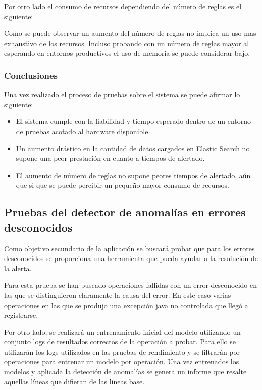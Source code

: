 Por otro lado el consumo de recursos dependiendo del número de reglas es el siguiente:

Como se puede observar un aumento del número de reglas no implica un uso mas exhaustivo de los recursos. Incluso probando con un número de reglas mayor al esperando en entornos productivos el uso de memoria se puede considerar bajo.


\subsubsection{Conclusiones}

Una vez realizado el proceso de pruebas sobre el sistema se puede afirmar lo siguiente:

\begin{itemize}

\item El sistema cumple con la fiabilidad y tiempo esperado dentro de un entorno de pruebas acotado al hardware disponible.

\item Un aumento drástico en la cantidad de datos cargados en Elastic Search no supone una peor prestación en cuanto a tiempos de alertado.

\item El aumento de número de reglas no supone peores tiempos de alertado, aún que si que se puede percibir un pequeño mayor consumo de recursos. 

\end{itemize}


\subsection{Pruebas del detector de anomalías en errores desconocidos}

Como objetivo secundario de la aplicación se buscará probar que para los errores desconocidos se proporciona una herramienta que pueda ayudar a la resolución de la alerta.

Para esta prueba se han buscado operaciones fallidas con un error desconocido en las que se distinguieron claramente la causa del error. En este caso varias operaciones en las que se produjo una excepción java no controlada que llegó a registrarse.

Por otro lado, se realizará un entrenamiento inicial del modelo utilizando un conjunto logs de resultados correctos de la operación a probar. Para ello se utilizarán los logs utilizados en las pruebas de rendimiento y se filtrarán por operaciones para entrenar un modelo por operación. Una vez entrenados los modelos y aplicada la detección de anomalías se genera un informe que resalte aquellas líneas que difieran de las líneas base. 

